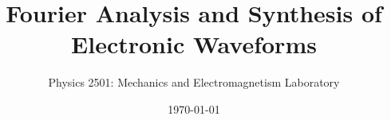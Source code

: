 \documentclass{revtex4}
\begin{document}

\title{Fourier Analysis and Synthesis of Electronic Waveforms}


\author{Physics 2501: Mechanics and Electromagnetism Laboratory}


\date{\today}




\maketitle

\end{document}
